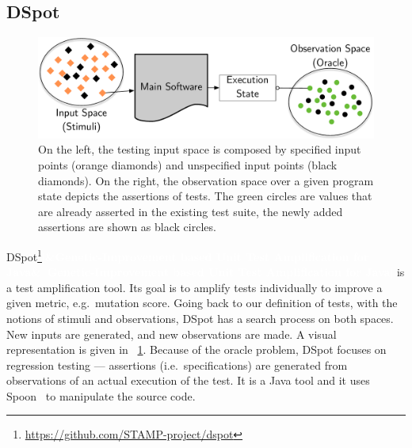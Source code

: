 \documentclass[11pt]{sdm_internship}
\newcommand{\addref}[1]{\colorbox{TealBlue!100}{\textcolor{white}{\textbf{$[$\ifx&#1&\ \else#1\fi$]$}}}}
\newcommand{\dspot}{DSpot\xspace}
\theoremstyle{definition}
\begin{document}
\subsection{\dspot{}}%
\label{ssec:dspot}

\begin{figure}
  \centering
  \includegraphics[width=36em]{spaces_report}
  \caption{On the left, the testing input space is composed by specified input points (orange diamonds) and unspecified input points (black diamonds). On the right, the observation space over a given program state depicts the assertions of tests. The green circles are values that are already asserted in the existing test suite, the newly added assertions are shown as black circles.}%
\label{fig:spaces}
\end{figure}

\dspot{}\footnote{\url{https://github.com/STAMP-project/dspot}}\addref{Genetic-Improvement based Unit Test Amplification for Java}\cite{baudry2015automatic,baudry2014tailored,baudry2015dspot} is a test amplification tool.
Its goal is to amplify tests individually to improve a given metric, e.g.\ mutation score.
Going back to our definition of tests, with the notions of stimuli and observations, \dspot{} has a search process on both spaces.
New inputs are generated, and new observations are made.
A visual representation is given in \figurename~\ref{fig:spaces}.
Because of the oracle problem, \dspot{} focuses on regression testing --- assertions (i.e.\ specifications) are generated from observations of an actual execution of the test.
It is a Java tool and it uses Spoon~\cite{pawlak2016spoon} to manipulate the source code.
\end{document}
